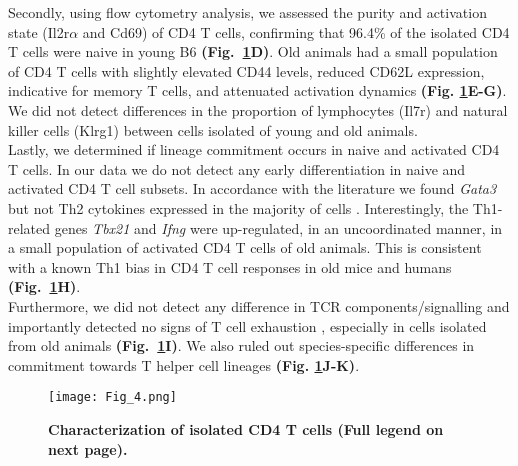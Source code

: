 Secondly, using flow cytometry analysis, we assessed the purity and activation state (Il2r$\alpha$ and Cd69) of CD4\plus{} T cells, confirming that 96.4\% of the isolated CD4\plus{} T cells were naive in young B6 \textbf{(Fig.~\ref{fig1:characterization}D)}. Old animals had a small population of CD4\plus{} T cells with slightly elevated CD44 levels, reduced CD62L expression, indicative for memory T cells, and attenuated activation dynamics \textbf{(Fig. \ref{fig1:characterization}E-G)}. We did not detect differences in the proportion of lymphocytes (Il7r) and natural killer cells (Klrg1) between cells isolated of young and old animals. \\

Lastly, we determined if lineage commitment occurs in naive and activated CD4\plus{} T cells. In our data we do not detect any early differentiation in naive and activated CD4\plus{} T cell subsets. In accordance with the literature we found \textit{Gata3} but not Th2 cytokines expressed in the majority of cells  \citep{Ho2009}. Interestingly, the Th1-related genes \textit{Tbx21} and \textit{Ifng} were up-regulated, in an uncoordinated manner, in a small population of activated CD4\plus{} T cells of old animals. This is consistent with a known Th1 bias in CD4\plus{} T cell responses in old mice \citep{Zhang2014} and humans \citep{Sakata-Kaneko2000} \textbf{(Fig.~\ref{fig1:characterization}H)}. \\

Furthermore, we did not detect any difference in TCR components/signalling and importantly detected no signs of T cell exhaustion \citep{Wherry2011}, especially in cells isolated from old animals \textbf{(Fig.~\ref{fig1:characterization}I)}. We also ruled out species-specific differences in commitment towards T helper cell lineages \textbf{(Fig. \ref{fig1:characterization}J-K)}. 

\newpage

\begin{figure}[!hb]
\centering
\texttt{[image: Fig\_4.png]}
\caption[Characterization of isolated CD4\plus{} T cells]{\textbf{Characterization of isolated CD4\plus{} T cells (Full legend on next page).}}
\label{fig1:characterization}
\end{figure}

